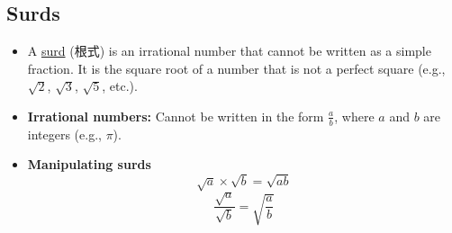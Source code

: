 
\subsection{Surds}
\begin{itemize}
    \item A \underline{surd} (根式) is an irrational number that cannot be written as a simple fraction. It is the square root
    of a number that is not a perfect square (e.g., $\sqrt{2}$, $\sqrt{3}$, $\sqrt{5}$, etc.).
    \item \textbf{Irrational numbers:} Cannot be written in the form $\frac{a}{b}$, where $a$ and $b$ are integers (e.g., $\pi$).
    \item \textbf{Manipulating surds}
    \begin{equation}
        \sqrt{a} \times \sqrt{b} = \sqrt{ab}
    \end{equation}
    \begin{equation}
        \frac{\sqrt{a}}{\sqrt{b}} = \sqrt{\frac{a}{b}}
    \end{equation}
\end{itemize}